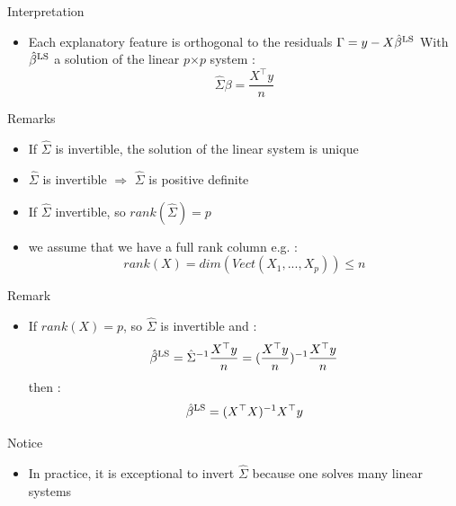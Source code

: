 \documentclass[unknownkeysallowed]{beamer}
\begin{document}
\begin{frame}

\begin{alertblock}{Interpretation}
    \begin{itemize}
        \item  Each explanatory feature is orthogonal to the residuals $\Gamma=y-X\hat{\beta}^{\rm LS}$ With $\hat{\beta}^{\rm LS}$ a solution of the linear $p$$\times$$p$ system : $$ \hat{\Sigma}\beta= \frac{X^{\top} y}{n}  $$

    \end{itemize}


\end{alertblock}

\begin{block}{Remarks}
    \begin{itemize}
        \item  If $\hat{\Sigma}$ is invertible, the solution of the linear system is unique
        \item $\hat{\Sigma}$ is invertible $\Rightarrow$ $\hat{\Sigma}$ is positive definite
        \item If $\hat{\Sigma}$ invertible, so $rank(\hat{\Sigma})=p$
        \item we assume that we have a full rank column e.g. : $$rank(X)=dim(Vect(X_1,...,X_p)) \leq n $$

    \end{itemize}


\end{block}
\end{frame}



\begin{frame}

\begin{alertblock}{Remark}
    \begin{itemize}
        \item  If $rank(X)=p$, so $\hat{\Sigma}$ is invertible and : $$\hat{\beta}^{\rm LS}=\hat{\Sigma}^{-1}\frac{X^{\top} y}{n}=(\frac{X^{\top} y}{n})^{-1} \frac{X^{\top} y}{n}$$
       then :  $$ \hat{\beta}^{\rm LS}=(X^{\top}X)^{-1}X^{\top}y$$

    \end{itemize}


\end{alertblock}

\begin{block}{Notice}
    \begin{itemize}
        \item  In practice, it is exceptional to invert $\hat{\Sigma} $ because one solves many linear systems
       
    \end{itemize}


\end{block}
\end{frame}
\end{document}
